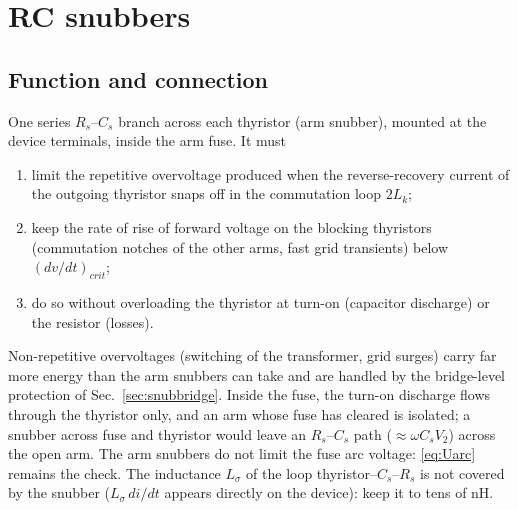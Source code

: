 \documentclass[10pt,a4paper]{scrartcl}
\newcommand{\Vll}{V_{2}}
\newcommand{\Lk}{L_{k}}
\begin{document}
\section{RC snubbers}\label{sec:snubber}
\subsection{Function and connection}
One series $R_s$--$C_s$ branch across each thyristor (arm snubber), mounted at the device terminals, inside the arm fuse. It must
\begin{enumerate}[label=(\roman*),leftmargin=*]
\item limit the repetitive overvoltage produced when the reverse-recovery current of the outgoing thyristor snaps off in the commutation loop $2\Lk$;
\item keep the rate of rise of forward voltage on the blocking thyristors (commutation notches of the other arms, fast grid transients) below $(dv/dt)_{crit}$;
\item do so without overloading the thyristor at turn-on (capacitor discharge) or the resistor (losses).
\end{enumerate}
Non-repetitive overvoltages (switching of the transformer, grid surges) carry far more energy than the arm snubbers can take and are handled by the bridge-level protection of Sec.~\ref{sec:snubbridge}. Inside the fuse, the turn-on discharge flows through the thyristor only, and an arm whose fuse has cleared is isolated; a snubber across fuse and thyristor would leave an $R_s$--$C_s$ path ($\approx\omega C_s\Vll$) across the open arm. The arm snubbers do not limit the fuse arc voltage: \eqref{eq:Uarc} remains the check. The inductance $L_\sigma$ of the loop thyristor--$C_s$--$R_s$ is not covered by the snubber ($L_\sigma\,di/dt$ appears directly on the device): keep it to tens of nH.
\end{document}

